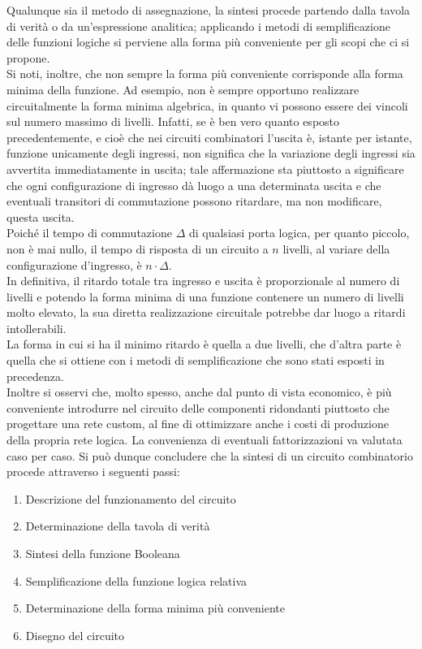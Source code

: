 \documentclass[a4paper]{extarticle}
\begin{document}
\noindent
Qualunque sia il metodo di assegnazione, la sintesi procede partendo dalla tavola di verità o da un’espressione analitica; applicando i metodi di semplificazione delle funzioni logiche si perviene alla forma più conveniente per gli scopi che ci si propone.\\
Si noti, inoltre, che non sempre la forma più conveniente corrisponde alla forma minima della funzione. Ad esempio, non è sempre opportuno realizzare circuitalmente la forma minima algebrica, in quanto vi possono essere dei vincoli sul numero massimo di livelli. Infatti, se è ben vero quanto esposto precedentemente, e cioè che nei circuiti combinatori l’uscita è, istante per istante, funzione unicamente degli ingressi, non significa che la variazione degli ingressi sia avvertita immediatamente in uscita; tale affermazione sta piuttosto a significare che ogni configurazione di ingresso dà luogo a una determinata uscita e che eventuali transitori di commutazione possono ritardare, ma non modificare, questa uscita.\\
Poiché il tempo di commutazione \(\Delta\) di qualsiasi porta logica, per quanto piccolo, non è mai nullo, il tempo di risposta di un circuito a \(n\) livelli, al variare della configurazione d’ingresso, è \(n \cdot \Delta\).\\
In definitiva, il ritardo totale tra ingresso e uscita è proporzionale al numero di livelli e potendo la forma minima di una funzione contenere un numero di livelli molto elevato, la sua diretta realizzazione circuitale potrebbe dar luogo a ritardi intollerabili.\\
La forma in cui si ha il minimo ritardo è quella a due livelli, che d’altra parte è quella che si ottiene con i metodi di semplificazione che sono stati esposti in precedenza.\\
Inoltre si osservi che, molto spesso, anche dal punto di vista economico, è più conveniente introdurre nel circuito delle componenti ridondanti piuttosto che progettare una rete custom, al fine di ottimizzare anche i costi di produzione della propria rete logica. La convenienza di eventuali fattorizzazioni va valutata caso per caso. Si può dunque concludere che la sintesi di un circuito combinatorio procede attraverso i seguenti passi:

\begin{enumerate}
    \item Descrizione del funzionamento del circuito
    \item Determinazione della tavola di verità
    \item Sintesi della funzione Booleana
    \item Semplificazione della funzione logica relativa
    \item Determinazione della forma minima più conveniente
    \item Disegno del circuito
\end{enumerate}
\end{document}

